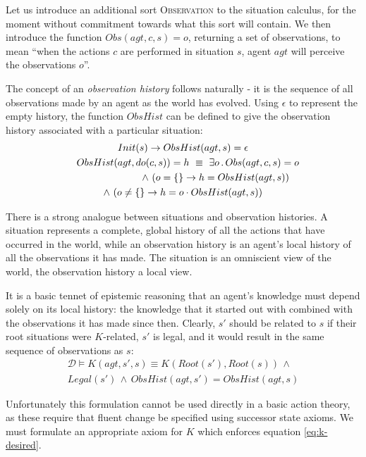 \documentclass{ifaamas-submission}
\newcommand{\noun}[1]{\textsc{#1}}
\begin{document}
Let us introduce an additional sort \noun{Observation}
to the situation calculus, for the moment without
commitment towards what this sort will contain. We
then introduce the function $Obs(agt,c,s)=o$, returning
a set of observations, to mean {}``when the actions $c$ are performed
in situation $s$, agent $agt$ will perceive the observations $o$''.

The concept of an \emph{observation history} follows naturally - it
is the sequence of all observations made by an agent as the world
has evolved. Using $\epsilon$ to represent the empty history,
the function $ObsHist$ can be defined  to give the observation history
associated with a particular situation:
\begin{multline}
Init(s)\rightarrow ObsHist(agt,s)=\epsilon\\
\shoveleft{ObsHist(agt,do(c,s))=h\,\,\equiv\,\,}
\exists o\,.\, Obs(agt,c,s)=o\\
\shoveright{\wedge\,\left(o=\{\}\rightarrow h=ObsHist(agt,s)\right)}\\
\wedge\,\left(o\neq\{\}\rightarrow h=o\cdot ObsHist(agt,s)\right)\label{eqn:obshist_defn}\end{multline}

There is a strong analogue between situations and observation histories.
A situation represents a complete, global history of all the actions
that have occurred in the world, while an observation history is an
agent's local history of all the observations it has made. The situation
is an omniscient view of the world, the observation history a local
view.

It is a basic tennet of epistemic reasoning that an agent's knowledge must
depend solely on its local history: the knowledge that it started out with
combined with the observations it has made since then.
Clearly, $s'$ should be related to $s$ if their root situations were
$K$-related, $s'$ is legal, and it would result in the same sequence of
observations as $s$:
\begin{multline}
\label{eq:k-desired}
\mathcal{D}\models K(agt,s',s)\equiv K(Root(s'),Root(s))\,\wedge\\
Legal(s')\,\wedge\, ObsHist(agt,s')=ObsHist(agt,s)
\end{multline}

Unfortunately this formulation cannot be used directly in a basic action
theory, as these require that fluent change be specified
using successor state axioms.  We must formulate an appropriate axiom for
$K$ which enforces equation \ref{eq:k-desired}.
\end{document}
